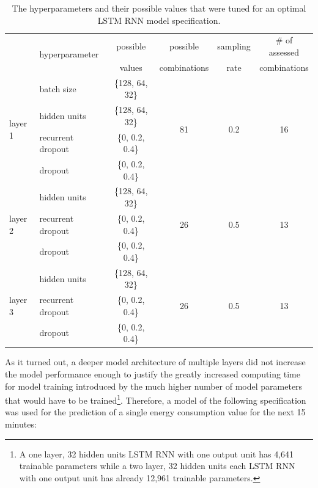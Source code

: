 \begin{table}[htbp]
    \begin{center}
        {\footnotesize
        \begin{tabular}{l|lcccc}
        \hline \hline
        & \multirow{2}{3em}{hyperparameter} & possible & possible     & sampling & \# of assessed \\
        &                                   & values   & combinations & rate     & combinations   \\
        \hline
                \multirow{4}{3em}{layer 1}  & batch size        & \{128, 64, 32\} & \multirow{4}{1em}{81} & \multirow{4}{1em}{0.2} & \multirow{4}{1em}{16} \\
                                            & hidden units      & \{128, 64, 32\} & & &\\
                                            & recurrent dropout & \{0, 0.2, 0.4\} & & & \\
                                            & dropout           & \{0, 0.2, 0.4\} & & & \\[0.2cm]
                                            & hidden units      & \{128, 64, 32\} & & & \\
                layer 2                     & recurrent dropout & \{0, 0.2, 0.4\} & 26 & 0.5 & 13 \\
                                            & dropout           & \{0, 0.2, 0.4\} & \\[0.2cm]
                                            & hidden units      & \{128, 64, 32\} & \\
                layer 3                     & recurrent dropout & \{0, 0.2, 0.4\} & 26 & 0.5 & 13 \\
                                            & dropout           & \{0, 0.2, 0.4\} & \\
            \hline \hline
        \end{tabular}}
    \end{center}
    \caption[Hyperparameters that were tuned for an optimal LSTM RNN model specification]{The hyperparameters and their possible values that were tuned for an optimal LSTM RNN model specification.}
    \label{Tab:LSTMHyperparameters}
\end{table}

As it turned out, a deeper model architecture of multiple layers did not increase the model performance enough to justify the greatly increased computing time for model training introduced by the much higher number of model parameters that would have to be trained\footnote{A one layer, 32 hidden units LSTM RNN with one output unit has 4,641 trainable parameters while a two layer, 32 hidden units each LSTM RNN with one output unit has already 12,961 trainable parameters.}. Therefore, a model of the following specification was used for the prediction of a single energy consumption value for the next 15 minutes:

